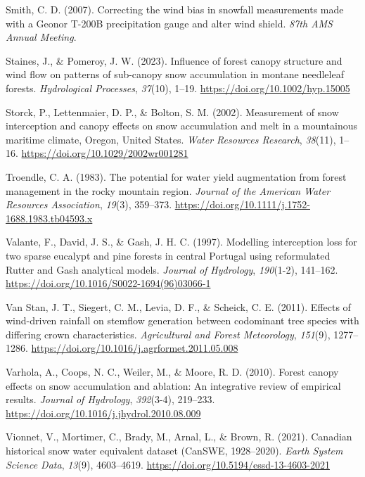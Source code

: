 \documentclass[
  letterpaper,
  DIV=11,
  numbers=noendperiod]{scrartcl}
\newlength{\cslhangindent}
\newenvironment{CSLReferences}[2] %
 {\begin{list}{}{%
  \setlength{\itemindent}{0pt}
  \setlength{\leftmargin}{0pt}
  \setlength{\parsep}{0pt}
  \ifodd #1
   \setlength{\leftmargin}{\cslhangindent}
   \setlength{\itemindent}{-1\cslhangindent}
  \fi
  \setlength{\itemsep}{#2\baselineskip}}}
 {\end{list}}
\begin{document}
\begin{CSLReferences}{1}{0}
Smith, C. D. (2007). Correcting the wind bias in snowfall measurements
made with a {Geonor T-200B} precipitation gauge and alter wind shield.
\emph{87th {AMS} Annual Meeting}.

Staines, J., \& Pomeroy, J. W. (2023). Influence of forest canopy
structure and wind flow on patterns of sub-canopy snow accumulation in
montane needleleaf forests. \emph{Hydrological Processes},
\emph{37}(10), 1--19. \url{https://doi.org/10.1002/hyp.15005}

Storck, P., Lettenmaier, D. P., \& Bolton, S. M. (2002). Measurement of
snow interception and canopy effects on snow accumulation and melt in a
mountainous maritime climate, {Oregon}, {United States}. \emph{Water
Resources Research}, \emph{38}(11), 1--16.
\url{https://doi.org/10.1029/2002wr001281}

Troendle, C. A. (1983). The potential for water yield augmentation from
forest management in the rocky mountain region. \emph{Journal of the
American Water Resources Association}, \emph{19}(3), 359--373.
\url{https://doi.org/10.1111/j.1752-1688.1983.tb04593.x}

Valante, F., David, J. S., \& Gash, J. H. C. (1997). Modelling
interception loss for two sparse eucalypt and pine forests in central
{Portugal} using reformulated {Rutter} and {Gash} analytical models.
\emph{Journal of Hydrology}, \emph{190}(1-2), 141--162.
\url{https://doi.org/10.1016/S0022-1694(96)03066-1}

Van Stan, J. T., Siegert, C. M., Levia, D. F., \& Scheick, C. E. (2011).
Effects of wind-driven rainfall on stemflow generation between
codominant tree species with differing crown characteristics.
\emph{Agricultural and Forest Meteorology}, \emph{151}(9), 1277--1286.
\url{https://doi.org/10.1016/j.agrformet.2011.05.008}

Varhola, A., Coops, N. C., Weiler, M., \& Moore, R. D. (2010). Forest
canopy effects on snow accumulation and ablation: {An} integrative
review of empirical results. \emph{Journal of Hydrology},
\emph{392}(3-4), 219--233.
\url{https://doi.org/10.1016/j.jhydrol.2010.08.009}

Vionnet, V., Mortimer, C., Brady, M., Arnal, L., \& Brown, R. (2021).
Canadian historical snow water equivalent dataset ({CanSWE},
1928--2020). \emph{Earth System Science Data}, \emph{13}(9), 4603--4619.
\url{https://doi.org/10.5194/essd-13-4603-2021}


\end{CSLReferences}
\end{document}
